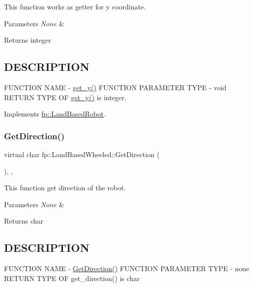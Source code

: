 This function works as getter for y coordinate. 


\begin{DoxyParams}{Parameters}
{\em None} & \\
\hline
\end{DoxyParams}
\begin{DoxyReturn}{Returns}
integer 
\end{DoxyReturn}
\hypertarget{_m_a_z_e_8h_DESCRIPTION}{}\subsection{D\+E\+S\+C\+R\+I\+P\+T\+I\+ON}\label{_m_a_z_e_8h_DESCRIPTION}
F\+U\+N\+C\+T\+I\+ON N\+A\+ME -\/ \hyperlink{classfp_1_1_land_based_wheeled_ae793757fd11ba270a6d9c335acb8cafd}{get\+\_\+y()} F\+U\+N\+C\+T\+I\+ON P\+A\+R\+A\+M\+E\+T\+ER T\+Y\+PE -\/ void R\+E\+T\+U\+RN T\+Y\+PE OF \hyperlink{classfp_1_1_land_based_wheeled_ae793757fd11ba270a6d9c335acb8cafd}{get\+\_\+y()} is integer. 

Implements \hyperlink{classfp_1_1_land_based_robot_ae742797bee07ac5b92bfe934cbfed6e9}{fp\+::\+Land\+Based\+Robot}.

\mbox{\label{classfp_1_1_land_based_wheeled_a87c986392b37f25dd63e03866c2ab9c2}} 
\subsubsection{\texorpdfstring{Get\+Direction()}{GetDirection()}}
{\footnotesize\ttfamily virtual char fp\+::\+Land\+Based\+Wheeled\+::\+Get\+Direction (\begin{DoxyParamCaption}{ }\end{DoxyParamCaption})\hspace{0.3cm}{\ttfamily [inline]}, {\ttfamily [override]}, {\ttfamily [virtual]}}



This function get direction of the robot. 


\begin{DoxyParams}{Parameters}
{\em None} & \\
\hline
\end{DoxyParams}
\begin{DoxyReturn}{Returns}
char 
\end{DoxyReturn}
\hypertarget{_m_a_z_e_8h_DESCRIPTION}{}\subsection{D\+E\+S\+C\+R\+I\+P\+T\+I\+ON}\label{_m_a_z_e_8h_DESCRIPTION}
F\+U\+N\+C\+T\+I\+ON N\+A\+ME -\/ \hyperlink{classfp_1_1_land_based_wheeled_a87c986392b37f25dd63e03866c2ab9c2}{Get\+Direction()} F\+U\+N\+C\+T\+I\+ON P\+A\+R\+A\+M\+E\+T\+ER T\+Y\+PE -\/ none R\+E\+T\+U\+RN T\+Y\+PE OF get\+\_\+direction() is char 

